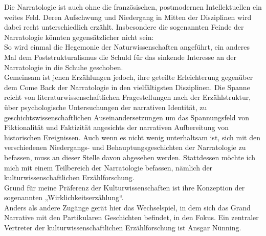 \noindent Die Narratologie ist auch ohne die französischen, postmodernen Intellektuellen
ein weites Feld. Deren Aufschwung und Niedergang in Mitten der Disziplinen wird
dabei recht unterschiedlich erzählt. Insbesondere die sogenannten Feinde der
Narratologie könnten gegensätzlicher nicht sein: \\
So wird einmal die Hegemonie
der Naturwissenschaften\footnotemark {} angeführt, ein anderes Mal dem Poststrukturalismus die
Schuld für das sinkende Interesse an der Narratologie in die Schuhe
geschoben\footnotemark {}. \\
Gemeinsam ist jenen Erzählungen jedoch, ihre geteilte Erleichterung
gegenüber dem Come Back der Narratologie in den vielfältigsten Disziplinen. Die
Spanne reicht von literaturwissenschaftlichen Fragestellungen nach der
Erzählstruktur, über psychologische Untersuchungen der narrativen Identität, zu
geschichtswissenschaftlichen Auseinandersetzungen um das Spannungsfeld von
Fiktionalität und Faktizität angesichts der narrativen Aufbereitung von
historischen Ereignissen. Auch wenn es nicht wenig unterhaltsam ist, sich mit
den verschiedenen Niedergangs- und Behauptungsgeschichten der Narratologie zu
befassen, muss an dieser Stelle davon abgesehen werden. Stattdessen möchte ich
mich mit einem Teilbereich der Narratologie befassen, nämlich der
kulturwissenschaftlichen Erzählforschung. \\
Grund für meine Präferenz der
Kulturwissenschaften ist ihre Konzeption der sogenannten
„Wirklichkeitserzählung“\footnotemark {}. \\
Anders als andere Zugänge gerät hier das
Wechselspiel, in dem sich das Grand Narrative mit den Partikularen Geschichten
befindet, in den Fokus. Ein zentraler Vertreter der kulturwissenschaftlichen 
Erzählforschung ist Ansgar Nünning.\\


